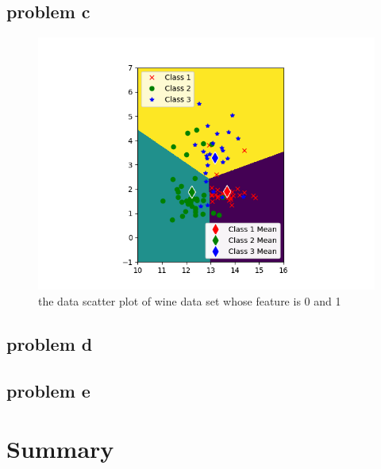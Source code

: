 \documentclass{article}
\begin{document}
	\subsection{problem c}
		\begin{figure}[hbt!]
		\includegraphics[width=\linewidth]{images/wine_feature01_train.png}	
		\caption{the data scatter plot of wine data set whose feature is 0 and 1}
		\label{fig:wine_feature01_train}
	\end{figure} 
	\subsection{problem d}
	\subsection{problem e}
	\section{Summary}
	
\end{document}
